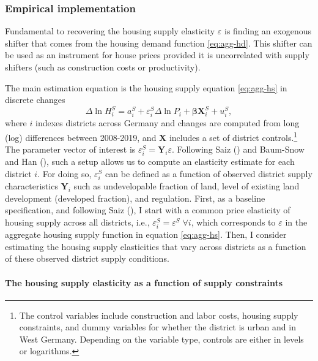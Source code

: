 \documentclass[
  12pt,
]{article}
\begin{document}
\subsubsection{Empirical implementation}\label{empirical-implementation}

Fundamental to recovering the housing supply elasticity \(\varepsilon\) is finding an exogenous shifter that comes from the housing demand function \eqref{eq:agg-hd}. This shifter can be used as an instrument for house prices provided it is uncorrelated with supply shifters (such as construction costs or productivity).

The main estimation equation is the housing supply equation \eqref{eq:agg-hs} in discrete changes \begin{equation}
\Delta\ln H_i^S =  a^S_i + \varepsilon^S_i\Delta\ln P_i + \boldsymbol{\beta}\mathbf{X}^S_i + u^S_i
\label{eq:main},
\end{equation}where \(i\) indexes districts across Germany and changes are computed from long (log) differences between 2008-2019, and \(\mathbf{X}\) includes a set of district controls.\footnote{The control variables include construction and labor costs, housing supply constraints, and dummy variables for whether the district is urban and in West Germany. Depending on the variable type, controls are either in levels or logarithms.} The parameter vector of interest is \(\varepsilon^S_i=\mathbf{Y}_i\varepsilon\). Following Saiz () and Baum-Snow and Han (), such a setup allows us to compute an elasticity estimate for each district \(i\). For doing so, \(\varepsilon^S_i\) can be defined as a function of observed district supply characteristics \(\mathbf{Y}_i\) such as undevelopable fraction of land, level of existing land development (developed fraction), and regulation. First, as a baseline specification, and following Saiz (), I start with a common price elasticity of housing supply across all districts, i.e., \(\varepsilon^S_i=\varepsilon^S \;\forall i\), which corresponds to \(\varepsilon\) in the aggregate housing supply function in equation \eqref{eq:agg-hs}. Then, I consider estimating the housing supply elasticities that vary across districts as a function of these observed district supply conditions.

\paragraph{The housing supply elasticity as a function of supply constraints}\label{decompose}
\end{document}
